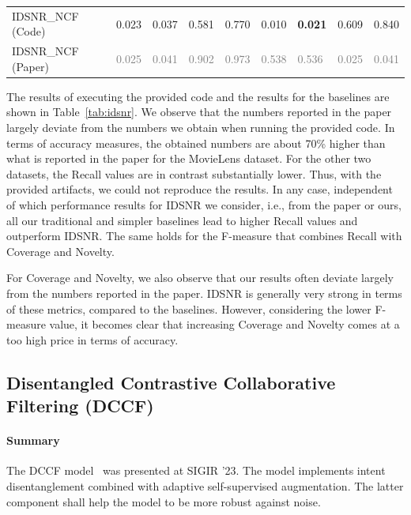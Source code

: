 \documentclass[sigconf,natbib=true,nonacm]{acmart}
\begin{document}
\begin{table}[htbp]
\begin{tabular}{l l l l l l l l l}
        IDSNR\_NCF  (Code)      & 0.023          & 0.037          & 0.581          & 0.770        & 0.010           & \textbf{0.021} & 0.609        & 0.840 \\
        IDSNR\_NCF (Paper)      & \textcolor{gray}{0.025}            & \textcolor{gray}{0.041}            & \textcolor{gray}{0.902}            & \textcolor{gray}{0.973}           & \textcolor{gray}{0.538} & \textcolor{gray}{0.536} & \textcolor{gray}{0.025}             & \textcolor{gray}{0.041}  \\ \hline
    \end{tabular}
\end{table}


The results of executing the provided code and the results for the baselines are shown in Table~\ref{tab:idsnr}. We observe that the numbers reported in the paper largely deviate from the numbers we obtain when running the provided code. In terms of accuracy measures, the obtained numbers are about 70\% higher than what is reported in the paper for the MovieLens dataset. For the other two datasets, the Recall values are in contrast substantially lower. Thus, with the provided artifacts, we could not reproduce the results. In any case, independent of which performance results for IDSNR we consider, i.e., from the paper or ours, all our traditional and simpler baselines lead to higher Recall values and outperform IDSNR. The same holds for the F-measure that combines Recall with Coverage and Novelty.

For Coverage and Novelty, we also observe that our results often deviate largely from the numbers reported in the paper. IDSNR is generally very strong in terms of these metrics, compared to the baselines. However, considering the lower F-measure value, it becomes clear that increasing Coverage and Novelty comes at a too high price in terms of accuracy.


\subsection{Disentangled Contrastive Collaborative Filtering (DCCF)}
\label{sec:DCCF}
\paragraph{Summary} The DCCF model~\cite{ren2023disentangled} was presented at SIGIR '23. The model implements intent disentanglement combined with adaptive self-supervised augmentation. The latter component shall help the model to be more robust against noise.
\end{document}
